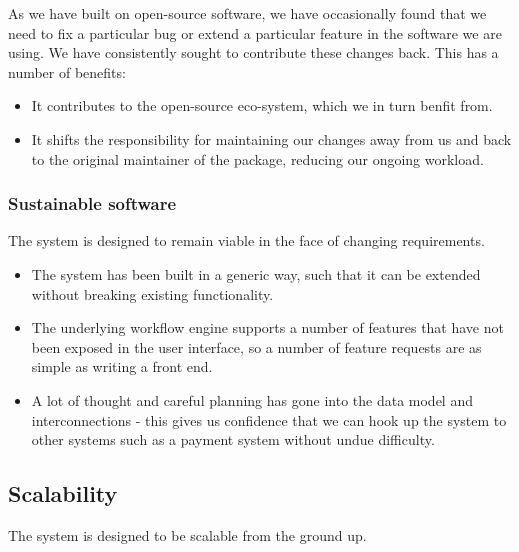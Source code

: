 \documentclass[12pt,a4paper,twosided]{article}
\begin{document}
As we have built on open-source software, we have occasionally found
that we need to fix a particular bug or extend a particular feature in
the software we are using. We have consistently sought to contribute
these changes back. This has a number of benefits:

\begin{itemize}

\item
  It contributes to the open-source eco-system, which we in turn benfit
  from.
\item
  It shifts the responsibility for maintaining our changes away from us
  and back to the original maintainer of the package, reducing our
  ongoing workload.
\end{itemize}

\subsubsection{Sustainable software}

The system is designed to remain viable in the face of changing
requirements.

\begin{itemize}

\item
  The system has been built in a generic way, such that it can be
  extended without breaking existing functionality.
\item
  The underlying workflow engine supports a number of features that have
  not been exposed in the user interface, so a number of feature
  requests are as simple as writing a front end.
\item
  A lot of thought and careful planning has gone into the data model and
  interconnections - this gives us confidence that we can hook up the
  system to other systems such as a payment system without undue
  difficulty.
\end{itemize}

\subsection{Scalability}

The system is designed to be scalable from the ground up.
\end{document}
